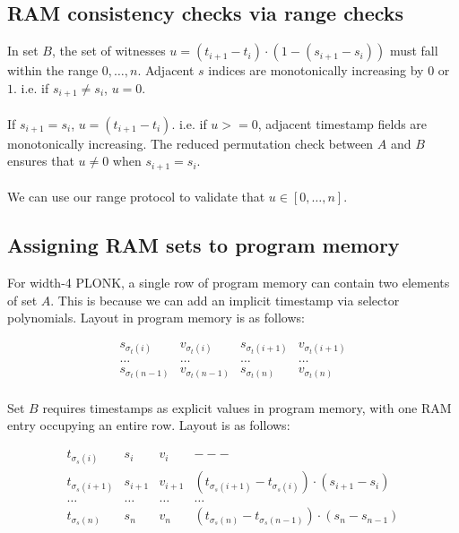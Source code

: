 \documentclass[11pt]{article} %
\begin{document}
\subsection{RAM consistency checks via range checks}

In set $B$, the set of witnesses $u = (t_{i + 1} - t_i) \cdot (1 - (s_{i + 1} - s_i))$ must fall within the range $0, \ldots, n$. Adjacent $s$ indices are monotonically increasing by $0$ or $1$. i.e. if $s_{i + 1} \ne s_i$, $u = 0$.
\\
\\
If $s_{i + 1} = s_i$, $u = (t_{i + 1} - t_i)$. i.e. if $u >= 0$, adjacent timestamp fields are monotonically increasing. The reduced permutation check between $A$ and $B$ ensures that $u \ne 0$ when $s_{i + 1} = s_i$.
\\
\\
We can use our range protocol to validate that $u \in [0, \ldots, n]$.

\subsection{Assigning RAM sets to program memory}

For width-4 PLONK, a single row of program memory can contain two elements of set $A$. This is because we can add an implicit timestamp via selector polynomials. Layout in program memory is as follows:

$$
\begin{array}{|c|c|c|c|}
s_{\sigma_t(i)} & v_{\sigma_t(i)} & s_{\sigma_t(i + 1)} & v_{\sigma_t(i + 1)} \\
\ldots & \ldots & \ldots & \ldots \\
s_{\sigma_t(n-1)} & v_{\sigma_t(n - 1)} & s_{\sigma_t(n)} & v_{\sigma_t(n)} \\
\end{array}
$$

Set $B$ requires timestamps as explicit values in program memory, with one RAM entry occupying an entire row. Layout is as follows:

$$
\begin{array}{|c|c|c|c|}
t_{\sigma_s(i)} & s_i & v_i & --- \\
t_{\sigma_s(i+1)} & s_{i+1} & v_{i+1} & (t_{\sigma_s(i+1)} - t_{\sigma_s(i)}) \cdot (s_{i+1} - s_{i}) \\
\ldots & \ldots & \ldots & \ldots \\
t_{\sigma_s(n)} & s_n & v_n & (t_{\sigma_s(n)} - t_{\sigma_s(n-1)}) \cdot (s_{n} - s_{n-1}) \\
\end{array}
$$
\end{document}
